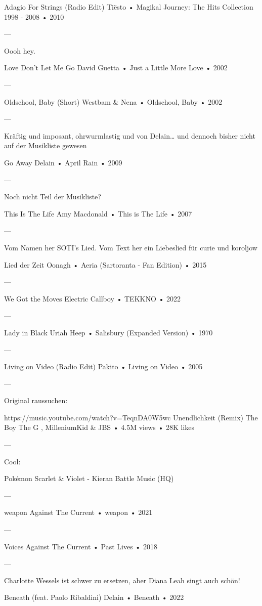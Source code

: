 Adagio For Strings (Radio Edit)
Tiësto
 •
Magikal Journey: The Hits Collection 1998 - 2008
 •
2010

—

Oooh hey.

Love Don't Let Me Go
David Guetta
 •
Just a Little More Love
 •
2002

—

Oldschool, Baby (Short)
Westbam
 &
Nena
 •
Oldschool, Baby
 •
2002

—

Kräftig und imposant, ohrwurmlastig und von Delain… und dennoch bisher nicht auf der Musikliste gewesen

Go Away
Delain
 •
April Rain
 •
2009

—

Noch nicht Teil der Musikliste?

This Is The Life
Amy Macdonald
 •
This is The Life
 •
2007

—

Vom Namen her SOTI's Lied. Vom Text her ein Liebeslied für curie und koroljow

Lied der Zeit
Oonagh
 •
Aeria (Sartoranta - Fan Edition)
 •
2015

—

We Got the Moves
Electric Callboy
 •
TEKKNO
 •
2022

—

Lady in Black
Uriah Heep
 •
Salisbury (Expanded Version)
 •
1970

—

Living on Video (Radio Edit)
Pakito
 •
Living on Video
 •
2005

—

Original raussuchen:

https://music.youtube.com/watch?v=TeqnDA0W5wc
Unendlichkeit (Remix)
The Boy The G
,
MilleniumKid
 &
JBS
 •
4.5M views
 •
28K likes


—

Cool:

Pokémon Scarlet & Violet - Kieran Battle Music (HQ)


—

weapon
Against The Current
 •
weapon
 •
2021

—

Voices
Against The Current
 •
Past Lives
 •
2018

—

Charlotte Wessels ist schwer zu ersetzen, aber Diana Leah singt auch schön!

Beneath (feat. Paolo Ribaldini)
Delain
 •
Beneath
 •
2022

